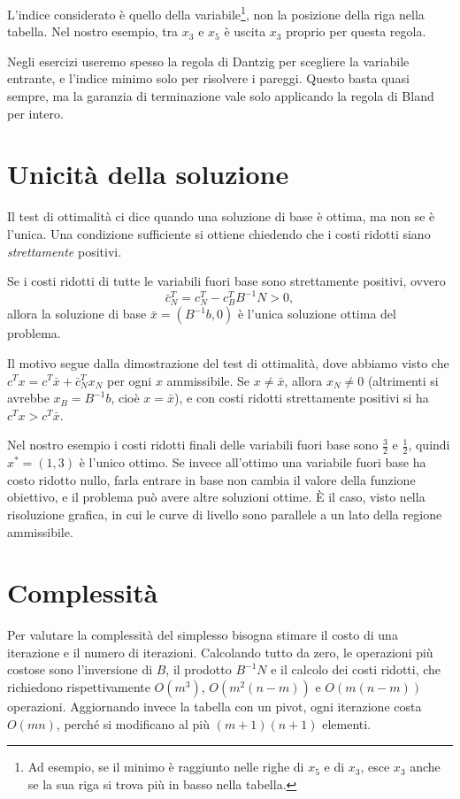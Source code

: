 L'indice considerato è quello della variabile\footnote{Ad esempio, se il minimo è raggiunto nelle righe di $x_5$ e di $x_3$, esce $x_3$ anche se la sua riga si trova più in basso nella tabella.}, non la posizione della riga nella tabella. Nel nostro esempio, tra $x_3$ e $x_5$ è uscita $x_3$ proprio per questa regola.

Negli esercizi useremo spesso la regola di Dantzig per scegliere la variabile entrante, e l'indice minimo solo per risolvere i pareggi. Questo basta quasi sempre, ma la garanzia di terminazione vale solo applicando la regola di Bland per intero.

\section{Unicità della soluzione}
Il test di ottimalità ci dice quando una soluzione di base è ottima, ma non se è l'unica. Una condizione sufficiente si ottiene chiedendo che i costi ridotti siano \emph{strettamente} positivi.

\begin{teorema}[Unicità]\label{teo:unicita}
Se i costi ridotti di tutte le variabili fuori base sono strettamente positivi, ovvero
\[
\bar{c}_N^T = c_N^T - c_B^T B^{-1} N > 0,
\]
allora la soluzione di base $\bar{x} = (B^{-1}b, 0)$ è l'unica soluzione ottima del problema.
\end{teorema}

Il motivo segue dalla dimostrazione del test di ottimalità, dove abbiamo visto che $c^T x = c^T \bar{x} + \bar{c}_N^T x_N$ per ogni $x$ ammissibile. Se $x \neq \bar{x}$, allora $x_N \neq 0$ (altrimenti si avrebbe $x_B = B^{-1}b$, cioè $x = \bar{x}$), e con costi ridotti strettamente positivi si ha $c^T x > c^T \bar{x}$.

Nel nostro esempio i costi ridotti finali delle variabili fuori base sono $\frac32$ e $\frac12$, quindi $x^* = (1, 3)$ è l'unico ottimo. Se invece all'ottimo una variabile fuori base ha costo ridotto nullo, farla entrare in base non cambia il valore della funzione obiettivo, e il problema può avere altre soluzioni ottime. È il caso, visto nella risoluzione grafica, in cui le curve di livello sono parallele a un lato della regione ammissibile.

\section{Complessità}
Per valutare la complessità del simplesso bisogna stimare il costo di una iterazione e il numero di iterazioni. Calcolando tutto da zero, le operazioni più costose sono l'inversione di $B$, il prodotto $B^{-1}N$ e il calcolo dei costi ridotti, che richiedono rispettivamente $O(m^3)$, $O(m^2(n-m))$ e $O(m(n-m))$ operazioni. Aggiornando invece la tabella con un pivot, ogni iterazione costa $O(mn)$, perché si modificano al più $(m+1)(n+1)$ elementi.


